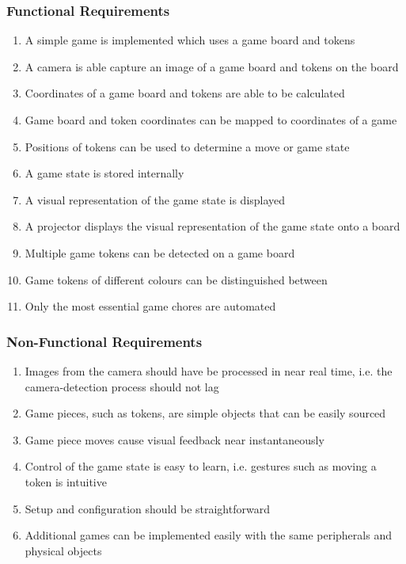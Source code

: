 \documentclass[12pt]{article}
\begin{document}
\subsubsection{Functional Requirements}
\begin{enumerate}
    \item A simple game is implemented which uses a game board and tokens
    \item A camera is able capture an image of a game board and tokens on the board
    \item Coordinates of a game board and tokens are able to be calculated
    \item Game board and token coordinates can be mapped to coordinates of a game
    \item Positions of tokens can be used to determine a move or game state
    \item A game state is stored internally
    \item A visual representation of the game state is displayed
    \item A projector displays the visual representation of the game state onto a board
    \item Multiple game tokens can be detected on a game board
    \item Game tokens of different colours can be distinguished between
    \item Only the most essential game chores are automated
\end{enumerate}

\subsubsection{Non-Functional Requirements}
\begin{enumerate}
    \item Images from the camera should have be processed in near real time, i.e. the camera-detection process should not lag
    \item Game pieces, such as tokens, are simple objects that can be easily sourced
    \item Game piece moves cause visual feedback near instantaneously
    \item Control of the game state is easy to learn, i.e. gestures such as moving a token is intuitive
    \item Setup and configuration should be straightforward
    \item Additional games can be implemented easily with the same peripherals and physical objects
\end{enumerate}
\end{document}
